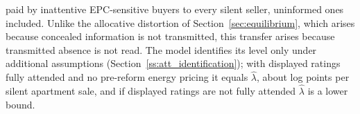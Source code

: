 paid by inattentive EPC-sensitive buyers to every silent seller, uninformed ones included. Unlike the allocative distortion of Section~\ref{sec:equilibrium}, which arises because concealed information is not transmitted, this transfer arises because transmitted absence is not read. The model identifies its level only under additional assumptions (Section~\ref{ss:att_identification}); with displayed ratings fully attended and no pre-reform energy pricing it equals $\hat\lambda$, about \attLamApt{} log points per silent apartment sale, and if displayed ratings are not fully attended $\hat\lambda$ is a lower bound.
